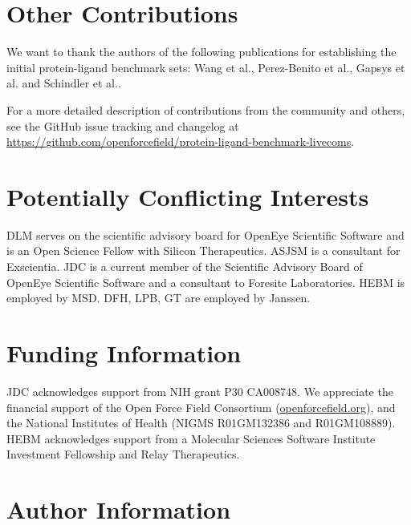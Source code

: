 \documentclass[9pt,bestpractices,pubversion]{livecoms}
\newcommand{\githubrepository}{\href{https://github.com/openforcefield/protein-ligand-benchmark-livecoms}{https://github.com/openforcefield/\hspace{0em}protein-ligand-benchmark-livecoms}}  %
\begin{document}
\section{Other Contributions}
%

We want to thank the authors of the following publications for establishing the initial protein-ligand benchmark sets: Wang et al.\cite{wang_accurate_2015}, Perez-Benito et al.\cite{perez-benito_predicting_2019}, Gapsys et al.\cite{gapsys_large_2020} and Schindler et al.\cite{schindler_largescale_2020}.

For a more detailed description of contributions from the community and others, see the GitHub issue tracking and changelog at \githubrepository.

\section{Potentially Conflicting Interests}

DLM serves on the scientific advisory board for OpenEye Scientific Software and is an Open Science Fellow with Silicon Therapeutics.
ASJSM is a consultant for Exscientia.
JDC is a current member of the Scientific Advisory Board of OpenEye Scientific Software and a consultant to Foresite Laboratories.
HEBM is employed by MSD. DFH, LPB, GT are employed by Janssen. 

\section{Funding Information}
JDC acknowledges support from NIH grant P30 CA008748.
We appreciate the financial support of the Open Force Field Consortium (\href{https://openforcefield.org}{openforcefield.org}), and the National Institutes of Health (NIGMS R01GM132386 and R01GM108889).
HEBM acknowledges support from a Molecular Sciences Software Institute Investment Fellowship and Relay Therapeutics.


\section*{Author Information}
\makeorcid




\end{document}
